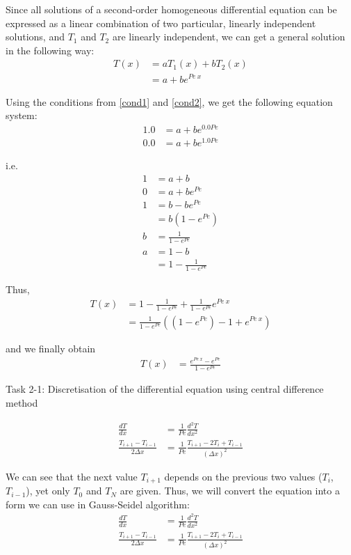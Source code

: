 \documentclass{article}
\begin{document}
Since all solutions of a second-order homogeneous differential equation can be expressed as a linear combination of two particular, linearly independent solutions, and $T_1$ and $T_2$ are linearly independent, we can get a general solution in the following way:
\begin{align}
  T(x) &= a T_1(x) + b T_2(x) \\
       &= a + b e^{Pe~x}
\end{align}

Using the conditions from \eqref{cond1} and \eqref{cond2}, we get the following equation system:
\begin{align}
  1.0 &= a + b e^{0.0 Pe} \\
  0.0 &= a + b e^{1.0 Pe}
\end{align}

i.e.
\begin{align}
  1 &= a + b \\
  0 &= a + b e^{Pe} \\
  1 &= b - b e^{Pe} \\
    &= b (1 - e^{Pe}) \\
  b &= \frac{1}{1 - e^{Pe}} \\
  a &= 1 - b \\
    &= 1 - \frac{1}{1 - e^{Pe}}
\end{align}

Thus,
\begin{align}
  T(x) &= 1 - \frac{1}{1 - e^{Pe}} + \frac{1}{1 - e^{Pe}} e^{Pe~x} \\
       &= \frac{1}{1 - e^{Pe}}((1 - e^{Pe}) - 1 + e^{Pe~x})
\end{align}

and we finally obtain
\begin{align}
  T(x) &= \frac{e^{Pe~x} - e^{Pe}}{1 - e^{Pe}}
\end{align}

Task 2-1: Discretisation of the differential equation using central difference method

\begin{align}
  \frac{dT}{dx} &= \frac{1}{Pe}\frac{d^2 T}{dx^2} \\
  \frac{T_{i + 1} - T_{i - 1}}{2 \Delta x} &= \frac{1}{Pe} \frac{T_{i + 1} - 2 T_i + T_{i - 1}}{(\Delta x)^2}
\end{align}

We can see that the next value $T_{i + 1}$ depends on the previous two values ($T_i$, $T_{i - 1}$), yet only $T_0$ and $T_N$ are given. Thus, we will convert the equation into a form we can use in Gauss-Seidel algorithm:
\begin{align}
  \frac{dT}{dx} &= \frac{1}{Pe}\frac{d^2 T}{dx^2} \\
  \frac{T_{i + 1} - T_{i - 1}}{2 \Delta x} &= \frac{1}{Pe} \frac{T_{i + 1} - 2 T_i + T_{i - 1}}{(\Delta x)^2}
\end{align}
\end{document}
